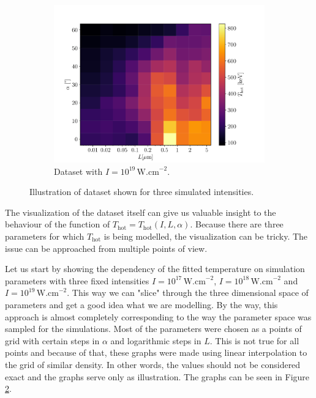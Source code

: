 \begin{figure}[ht]
\begin{subfigure}{0.49\textwidth}
		\includegraphics[width=\textwidth]{figures/I_1e19t_hot}
		\caption{Dataset with $I = 10^{19} \, \mathrm{W.cm}^{-2}$.}
		\label{fig:dataset1-c}
	\end{subfigure}
	\caption{Illustration of dataset shown for three simulated intensities.}
	\label{fig:dataset1}
\end{figure}


The visualization of the dataset itself can give us valuable insight to the behaviour of the function of $T_{\mathrm{hot}} = T_{\mathrm{hot}}(I,L,\alpha)$. Because there are three parameters for which $T_{\mathrm{hot}}$ is being modelled, the visualization can be tricky. The issue can be approached from multiple points of view.

Let us start by showing the dependency of the fitted temperature on simulation parameters with three fixed intensities $I = 10^{17} \,\mathrm{W.cm}^{-2}$, $I = 10^{18} \,\mathrm{W.cm}^{-2}$ and $I = 10^{19} \,\mathrm{W.cm}^{-2}$. This way we can "slice" through the three dimensional space of parameters and get a good idea what we are modelling. By the way, this approach is almost completely corresponding to the way the parameter space was sampled for the simulations. Most of the parameters were chosen as a points of grid with certain steps in $\alpha$ and logarithmic steps in $L$. This is not true for all points and because of that, these graphs were made using linear interpolation to the grid of similar density. In other words, the values should not be considered exact and the graphs serve only as illustration. The graphs can be seen in Figure \ref{fig:dataset1}.


